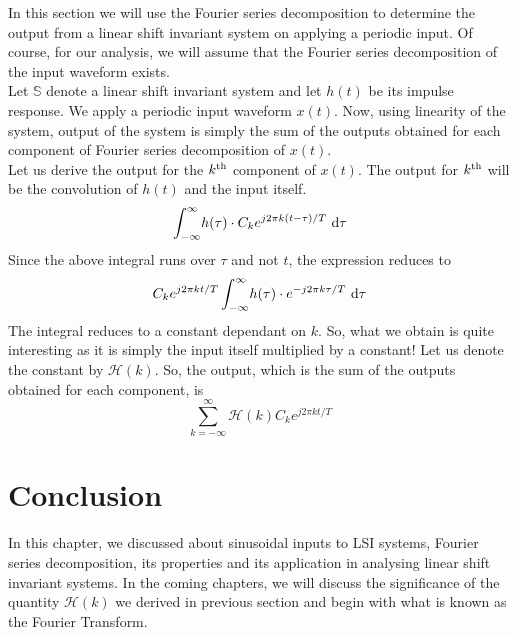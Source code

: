 In this section we will use the Fourier series decomposition to determine the output from a linear shift invariant system on applying a periodic input. Of course, for our analysis, we will assume that the Fourier series decomposition of the input waveform exists.\\
Let $\mathbb{S}$ denote a linear shift invariant system and let $h(t)$ be its impulse response. We apply a periodic input waveform $x(t)$. Now, using linearity of the system, output of the system is simply the sum of the outputs obtained for each component of Fourier series decomposition of $x(t)$.\\
Let us derive the output for the $k^{\textnormal{th}}$ component of $x(t)$. The output for $k^{\textnormal{th}}$ will be the convolution of $h(t)$ and the input itself.
\begin{equation*}
	\int_{-\infty}^{\infty} \! {h(\tau) \cdot C_{k}e^{j2\pi k(t- \tau)/T}} \ \mathrm{d} \tau	
\end{equation*}
Since the above integral runs over $\tau$ and not $t$, the expression reduces to
\begin{equation*}
	C_{k}e^{j2\pi kt/T}\int_{-\infty}^{\infty} \! {h(\tau) \cdot e^{-j2\pi k\tau/T}} \ \mathrm{d} \tau
\end{equation*}
The integral reduces to a constant dependant on $k$. So, what we obtain is quite interesting as it is simply the input itself multiplied by a constant!
Let us denote the constant by $\mathcal{H}(k)$. So, the output, which is the sum of the outputs obtained for each component, is
\begin{equation*}
	\sum_{k=-\infty}^{\infty}\mathcal{H}(k)C_{k}e^{j2\pi kt/T}	
\end{equation*}
\section {Conclusion} In this chapter, we discussed about sinusoidal inputs to LSI systems, Fourier series decomposition, its properties and its application in analysing linear shift invariant systems. In the coming chapters, we will discuss the significance of the quantity $\mathcal{H}(k)$ we derived in previous section and begin with what is known as the Fourier Transform.